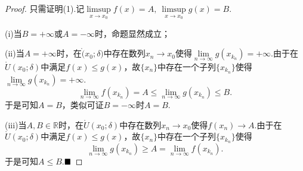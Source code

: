 \begin{proof}
	只需证明(1).记$\limsup\limits_{x\to x_0}f(x)=A,\ \limsup\limits_{x\to x_0}g(x)=B.$
	
	(i)当$B=+\infty$或$A=-\infty$时，命题显然成立；
	
	(ii)当$A=+\infty$时，在$\mathring(x_0;\delta)$中存在数列$x_n\to x_0$使得$\lim\limits_{n\to \infty}g(x_{k_n})=+\infty.$由于在$\mathring{U}(x_0;\delta)$中满足$f(x)\leqslant g(x)$，故$\{x_n\}$中存在一个子列$\{x_{k_n}\}$使得$\lim\limits_{n\to\infty}g(x_{k_n})=+\infty$.
	$$\lim\limits_{n\to\infty}f(x_{k_n})=A\leqslant\lim\limits_{n\to\infty}g(x_{k_n})\leqslant B.$$
	于是可知$A=B$，类似可证$B=-\infty$时$A=B$.
	
	(iii)当$A,B\in\mathbb{R}$时，在$\mathring{U}(x_0;\delta)$中存在数列$x_n\to x_0$使得$f(x_n)\to A$.由于在$\mathring{U}(x_0;\delta)$中满足$f(x)\leqslant g(x)$，故$\{x_n\}$中存在一个子列$\{x_{k_n}\}$使得
	$$\lim\limits_{n\to\infty}g(x_{k_n})\geqslant A=\lim\limits_{n\to\infty}f(x_{k_n}).$$
	于是可知$A\leqslant B$.$\hfill\blacksquare$
\end{proof}

